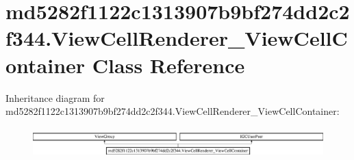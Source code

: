 \hypertarget{classmd5282f1122c1313907b9bf274dd2c2f344_1_1ViewCellRenderer__ViewCellContainer}{}\section{md5282f1122c1313907b9bf274dd2c2f344.\+View\+Cell\+Renderer\+\_\+\+View\+Cell\+Container Class Reference}
\label{classmd5282f1122c1313907b9bf274dd2c2f344_1_1ViewCellRenderer__ViewCellContainer}
Inheritance diagram for md5282f1122c1313907b9bf274dd2c2f344.\+View\+Cell\+Renderer\+\_\+\+View\+Cell\+Container\+:\begin{figure}[H]
\begin{center}
\leavevmode
\includegraphics[height=1.174004cm]{classmd5282f1122c1313907b9bf274dd2c2f344_1_1ViewCellRenderer__ViewCellContainer}
\end{center}
\end{figure}
